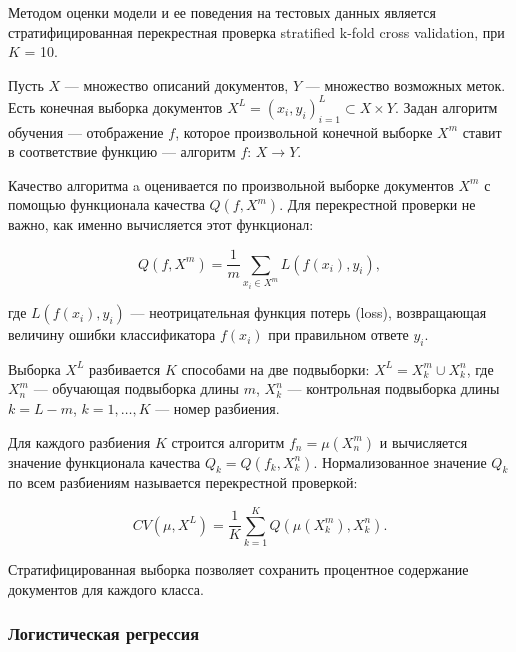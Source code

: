 Методом оценки модели и ее поведения на тестовых данных является стратифицированная перекрестная проверка stratified k-fold cross validation, при $K$ = 10.

Пусть $X$ --- множество описаний документов, $Y$ --- множество возможных меток.
Есть конечная выборка документов $X^L = (x_i,y_i)_{i=1}^L \subset X\times Y$.
Задан алгоритм обучения --- отображение $f$, которое произвольной конечной выборке $X^m$ ставит в соответствие функцию --- алгоритм $f:\,X\to Y$.

\bigskip
Качество алгоритма a оценивается по произвольной выборке документов $X^m$ с помощью функционала качества $Q(f,X^m)$. Для перекрестной проверки не важно, как именно вычисляется этот функционал:

\begin{equation*}
 Q(f,X^m)=\frac{1}{m}\sum_{x_i\in X^m} L(f(x_i),y_i),
\end{equation*}

\bigskip
где $L(f(x_i),y_i)$ — неотрицательная функция потерь (loss), возвращающая величину ошибки классификатора $f(x_i)$ при правильном ответе $y_i$.

\bigskip
Выборка $X^L$ разбивается $K$ способами на две подвыборки: $X^L = X^m_k \cup X^n_k$, где $X^m_n$ — обучающая подвыборка длины $m$, $X^n_k$ — контрольная подвыборка длины $k=L-m$, $k=1,\ldots,K$ — номер разбиения.

\bigskip
Для каждого разбиения $K$ строится алгоритм $f_n = \mu(X^m_n)$ и вычисляется значение функционала качества $Q_k = Q (f_k, X^n_k)$. Нормализованное значение $Q_k$ по всем разбиениям называется перекрестной проверкой:

\begin{equation*}
 CV(\mu,X^L)=\frac1K \sum_{k=1}^K Q (\mu(X^m_k), X^n_k).
\end{equation*}

\bigskip
Стратифицированная выборка позволяет сохранить процентное содержание документов для каждого класса.




















\subsubsection{Логистическая регрессия}
\label{subsection:logreg}

